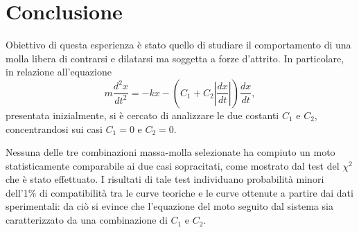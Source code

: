 \documentclass{article}
\begin{document}
\section{Conclusione}
Obiettivo di questa esperienza è stato quello di studiare il comportamento di una molla libera di contrarsi e dilatarsi ma soggetta a forze d'attrito. In particolare, in relazione all'equazione 
\begin{equation}
    m\frac{d^2x}{dt^2}=-kx-(C_1+C_2|{\frac{dx}{dt}}|)\frac{dx}{dt},
\end{equation} 
presentata inizialmente, si è cercato di analizzare le due costanti $C_1$ e $C_2$, concentrandosi sui casi $C_1=0$ e $C_2=0$. 

Nessuna delle tre combinazioni massa-molla selezionate ha compiuto un moto statisticamente comparabile ai due casi sopracitati, come mostrato dal test del $\chi^2$ che è stato effettuato. I risultati di tale test individuano probabilità minori dell'1\% di compatibilità tra le curve teoriche e le curve ottenute a partire dai dati sperimentali: da ciò si evince che l'equazione del moto seguito dal sistema sia caratterizzato da una combinazione di $C_1$ e $C_2$.
\end{document}
